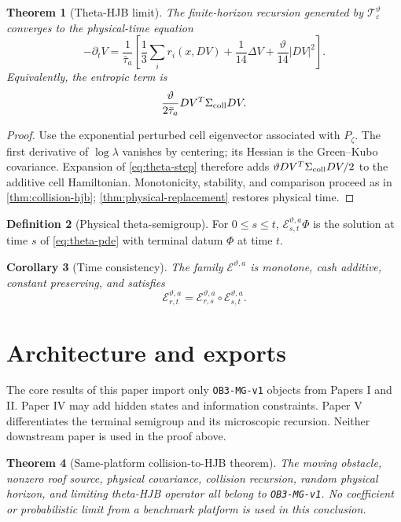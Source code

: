 \documentclass[11pt,reqno]{amsart}
\newtheorem{theorem}{Theorem}[section]
\newtheorem{corollary}[theorem]{Corollary}
\theoremstyle{definition}
\newtheorem{definition}[theorem]{Definition}
\theoremstyle{remark}
\newcommand{\cE}{\mathcal E}
\newcommand{\abs}[1]{\left\lvert #1\right\rvert}
\begin{document}
\begin{theorem}[Theta-HJB limit]\label{thm:theta-hjb}
The finite-horizon recursion generated by
$\mathcal T_\varepsilon^\vartheta$ converges to the physical-time equation
\begin{equation}\label{eq:theta-pde}
 -\partial_tV
 =
 \frac1{\bar\tau_a}
 \left[
 \frac13\sum_i r_i(x,DV)
 +\frac1{14}\Delta V
 +\frac{\vartheta}{14}\abs{DV}^2
 \right].
\end{equation}
Equivalently, the entropic term is
\[
 \frac{\vartheta}{2\bar\tau_a}
 DV^T\Sigma_{\rm coll}DV.
\]
\end{theorem}

\begin{proof}
Use the exponential perturbed cell eigenvector associated with $P_\zeta$.
The first derivative of $\log\lambda$ vanishes by centering; its Hessian is
the Green--Kubo covariance.  Expansion of \eqref{eq:theta-step} therefore adds
$\vartheta DV^T\Sigma_{\rm coll}DV/2$ to the additive cell Hamiltonian.
Monotonicity, stability, and comparison proceed as in
\cref{thm:collision-hjb}; \cref{thm:physical-replacement} restores physical
time.
\end{proof}

\begin{definition}[Physical theta-semigroup]
For $0\le s\le t$, $\cE^{\vartheta,a}_{s,t}\Phi$ is the solution at time $s$
of \eqref{eq:theta-pde} with terminal datum $\Phi$ at time $t$.
\end{definition}

\begin{corollary}[Time consistency]\label{cor:time-consistency}
The family $\cE^{\vartheta,a}$ is monotone, cash additive, constant preserving,
and satisfies
\[
 \cE^{\vartheta,a}_{r,t}
 =
 \cE^{\vartheta,a}_{r,s}
 \circ\cE^{\vartheta,a}_{s,t}.
\]
\end{corollary}

\section{Architecture and exports}

The core results of this paper import only \texttt{OB3-MG-v1} objects from
Papers I and II.  Paper IV may add hidden states and information constraints.
Paper V differentiates the terminal semigroup and its microscopic recursion.
Neither downstream paper is used in the proof above.

\begin{theorem}[Same-platform collision-to-HJB theorem]\label{thm:main}
The moving obstacle, nonzero roof source, physical covariance, collision
recursion, random physical horizon, and limiting theta-HJB operator all belong
to \texttt{OB3-MG-v1}.  No coefficient or probabilistic limit from a benchmark
platform is used in this conclusion.
\end{theorem}
\end{document}
